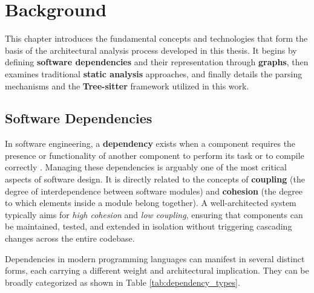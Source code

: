 \chapter{Background}
\label{ch:background}

This chapter introduces the fundamental concepts and technologies
that form the basis of the architectural analysis process developed
in this thesis. It begins by defining \textbf{software dependencies}
and their representation through \textbf{graphs}, then examines
traditional \textbf{static analysis} approaches, and finally details
the parsing mechanisms and the \textbf{Tree-sitter} framework
utilized in this work.

\section{Software Dependencies}
\label{sec:software_dependencies}

In software engineering, a \textbf{dependency} exists when a
component requires the presence or functionality of another component
to perform its task or to compile correctly
\cite{martin_clean_2018}. Managing these dependencies is
arguably one of the most critical aspects of software design. It is
directly related to the concepts of \textbf{coupling} (the degree of
interdependence between software modules) and \textbf{cohesion} (the
degree to which elements inside a module belong together). A
well-architected system typically aims for \textit{high cohesion} and
\textit{low coupling}, ensuring that components can be maintained,
tested, and extended in isolation without triggering cascading
changes across the entire codebase.

Dependencies in modern programming languages can manifest in several
distinct forms, each carrying a different weight and architectural
implication. They can be broadly categorized as shown in Table
\ref{tab:dependency_types}.

